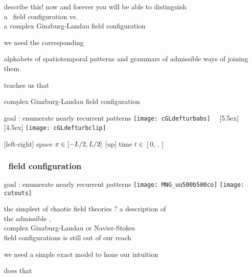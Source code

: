 \begin{frame}{describe this!}
now and forever you will be able to distinguish
\\
 a \KS\ field configuration vs.
 \\
a complex Ginzburg-Landau field configuration

\bigskip
we need the corresponding
\begin{block}{alphabets of spatiotemporal patterns} %
and grammars of admissible ways of joining them
\end{block}
\vfill

{\Large \catlatt} \hfill teaches us that
\end{frame}

\begin{frame}{complex Ginzburg-Landau field configuration}
\begin{block}{goal : enumerate nearly recurrent patterns } %
  \texttt{[image: cGLdefturbabs]}%
~~\raisebox{+3.33ex}[5.5ex][4.5ex]
		 {\texttt{[image: cGLdefturbclip]}}
\end{block}

{\footnotesize
[left-right] space $x \in [-L/2,L/2]$
\qquad
{[up]} time $t\in [0,\period{}]$
}
\end{frame}

\begin{frame}
    \frametitle{\KS\  field configuration}
\begin{block}{goal : enumerate nearly recurrent patterns } %
\texttt{[image: MNG\_uu500b500co]}
\texttt{[image: cutouts]}
\end{block}
\end{frame}

\begin{frame}{the simplest of chaotic field theories ?}
a description of \\
the admissible \KS, \\
complex Ginzburg-Landau
or Navier-Stokes \\
field configurations is still out of our reach

\bigskip
\begin{block}{we need a simple exact model to hone our intuition}
\bigskip

{\Large \catlatt} \hfill does that
\end{block}
\end{frame}

